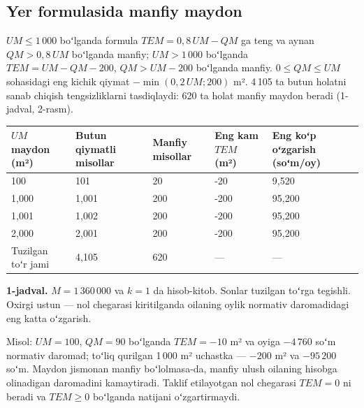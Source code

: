 \documentclass[12pt,a4paper]{extarticle}
\begin{document}
\subsection{Yer formulasida manfiy maydon}
$UM\le1\,000$ boʻlganda formula $TEM=0{,}8\,UM-QM$ ga teng va aynan $QM>0{,}8\,UM$ boʻlganda manfiy; $UM>1\,000$ boʻlganda $TEM=UM-QM-200$, $QM>UM-200$ boʻlganda manfiy. $0\le QM\le UM$ sohasidagi eng kichik qiymat $-\min(0{,}2\,UM;200)$ m². 4\,105 ta butun holatni sanab chiqish tengsizliklarni tasdiqlaydi: 620 ta holat manfiy maydon beradi (1-jadval, 2-rasm).

\begingroup\fontsize{11bp}{13.2bp}\selectfont
\begin{longtable}{p{} p{} p{} p{} p{}}
\toprule
$UM$ maydon (m²) & Butun qiymatli misollar & Manfiy misollar & Eng kam $TEM$ (m²) & Eng koʻp oʻzgarish (soʻm/oy) \\
\midrule
\endhead
100 & 101 & 20 & -20 & 9,520 \\
1,000 & 1,001 & 200 & -200 & 95,200 \\
1,001 & 1,002 & 200 & -200 & 95,200 \\
2,000 & 2,001 & 200 & -200 & 95,200 \\
Tuzilgan toʻr jami & 4,105 & 620 & — & — \\
\bottomrule
\end{longtable}
\endgroup
\textbf{1-jadval.} $M=1\,360\,000$ va $k=1$ da hisob-kitob. Sonlar tuzilgan toʻrga tegishli. Oxirgi ustun — nol chegarasi kiritilganda oilaning oylik normativ daromadidagi eng katta oʻzgarish.

Misol: $UM=100$, $QM=90$ boʻlganda $TEM=-10$ m² va oyiga $-4\,760$ soʻm normativ daromad; toʻliq qurilgan 1\,000 m² uchastka — $-200$ m² va $-95\,200$ soʻm. Maydon jismonan manfiy boʻlolmasa-da, manfiy ulush oilaning hisobga olinadigan daromadini kamaytiradi. Taklif etilayotgan nol chegarasi $TEM=0$ ni beradi va $TEM\ge0$ boʻlganda natijani oʻzgartirmaydi.
\end{document}
